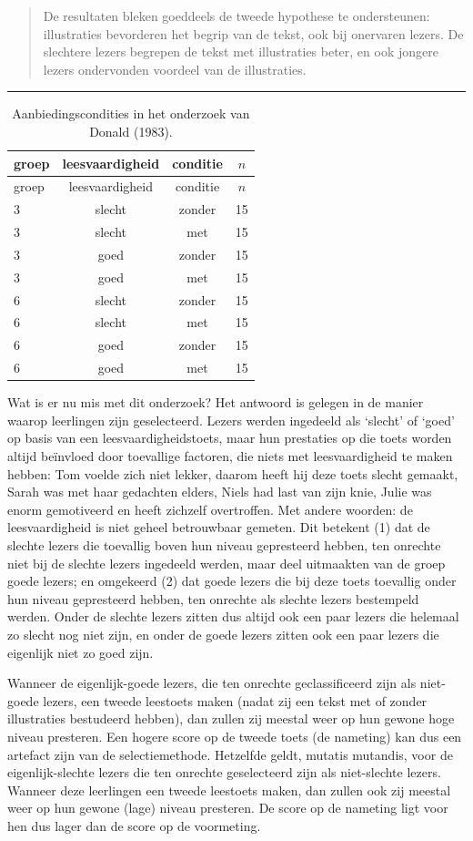 \documentclass[
]{book}
\begin{document}
\begin{quote}
De resultaten bleken goeddeels de tweede hypothese te ondersteunen:
illustraties bevorderen het begrip van de tekst, ook bij onervaren
lezers. De slechtere lezers begrepen de tekst met illustraties beter, en
ook jongere lezers ondervonden voordeel van de illustraties.
\end{quote}

\begin{center}\rule{0.5\linewidth}{0.5pt}\end{center}

\begin{longtable}[]{@{}lccc@{}}
\caption{\label{tab:designDona83} Aanbiedingscondities in het onderzoek van Donald (1983).}\tabularnewline
\toprule
groep & leesvaardigheid & conditie & \(n\)\tabularnewline
\midrule
\endfirsthead
\toprule
groep & leesvaardigheid & conditie & \(n\)\tabularnewline
\midrule
\endhead
3 & slecht & zonder & 15\tabularnewline
3 & slecht & met & 15\tabularnewline
3 & goed & zonder & 15\tabularnewline
3 & goed & met & 15\tabularnewline
6 & slecht & zonder & 15\tabularnewline
6 & slecht & met & 15\tabularnewline
6 & goed & zonder & 15\tabularnewline
6 & goed & met & 15\tabularnewline
\bottomrule
\end{longtable}

Wat is er nu mis met dit onderzoek? Het antwoord is gelegen in de manier
waarop leerlingen zijn geselecteerd. Lezers werden ingedeeld als
`slecht' of `goed' op basis van een leesvaardigheidstoets, maar hun
prestaties op die toets worden altijd beïnvloed door toevallige
factoren, die niets met leesvaardigheid te maken hebben: Tom voelde zich
niet lekker, daarom heeft hij deze toets slecht gemaakt, Sarah was met
haar gedachten elders, Niels had last van zijn knie, Julie was enorm
gemotiveerd en heeft zichzelf overtroffen. Met andere woorden: de
leesvaardigheid is niet geheel betrouwbaar gemeten. Dit betekent (1) dat
de slechte lezers die toevallig boven hun niveau gepresteerd hebben, ten
onrechte niet bij de slechte lezers ingedeeld werden, maar deel
uitmaakten van de groep goede lezers; en omgekeerd (2) dat goede lezers
die bij deze toets toevallig onder hun niveau gepresteerd hebben, ten
onrechte als slechte lezers bestempeld werden. Onder de slechte lezers
zitten dus altijd ook een paar lezers die helemaal zo slecht nog niet
zijn, en onder de goede lezers zitten ook een paar lezers die eigenlijk
niet zo goed zijn.

Wanneer de eigenlijk-goede lezers, die ten onrechte geclassificeerd zijn
als niet-goede lezers, een tweede leestoets maken (nadat zij een tekst
met of zonder illustraties bestudeerd hebben), dan zullen zij meestal
weer op hun gewone hoge niveau presteren. Een hogere score op de tweede
toets (de nameting) kan dus een artefact zijn van de selectiemethode.
Hetzelfde geldt, mutatis mutandis, voor de eigenlijk-slechte lezers die
ten onrechte geselecteerd zijn als niet-slechte lezers. Wanneer deze
leerlingen een tweede leestoets maken, dan zullen ook zij meestal weer
op hun gewone (lage) niveau presteren. De score op de nameting ligt voor
hen dus lager dan de score op de voormeting.
\end{document}
